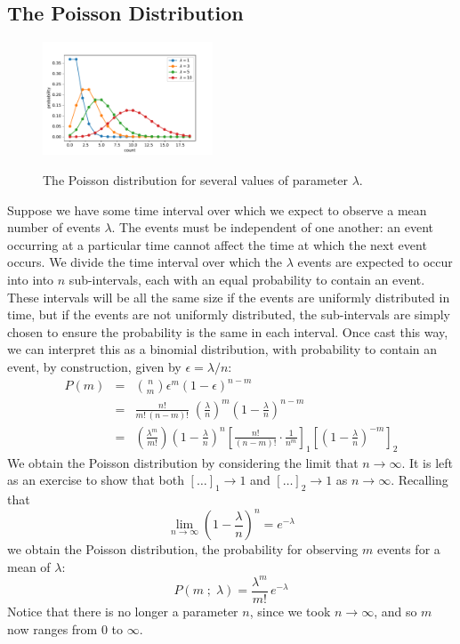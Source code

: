 \documentclass[12pt]{article}
\begin{document}
\subsection{The Poisson Distribution}

\begin{figure}[htbp]
\begin{center}
{\includegraphics[width=0.45\textwidth]{figs/chap_dist_poisson.pdf}}
\end{center}
\caption{\label{fig:poisson}  The Poisson distribution for several values of parameter $\lambda$.}
\end{figure}


Suppose we have some time interval over which we expect to observe a mean number of events $\lambda$.  The events must be independent of one another:  an event occurring at a particular time cannot affect the time at which the next event occurs.  We divide the time interval over which the $\lambda$ events are expected to occur into into $n$ sub-intervals, each with an equal probability to contain an event.  These intervals will be all the same size if the events are uniformly distributed in time, but if the events are not uniformly distributed, the sub-intervals are simply chosen to ensure the probability is the same in each interval.  Once cast this way, we can interpret this as a binomial distribution, with probability to contain an event, by construction, given by $\epsilon = \lambda / n$:
\begin{eqnarray*}
P(m) &=& \binom{n}{m} \epsilon^m (1-\epsilon)^{n-m} \\[5pt]
  &=& \frac{n!}{m! \, (n-m)!} \; \left( \frac{\lambda}{n} \right)^m \left( 1 - \frac{\lambda}{n}\right)^{n-m} \\[5pt]
  &=& \left( \frac{\lambda^m}{m!} \right) \left(1-\frac{\lambda}{n} \right)^n \left[ \frac{n!}{(n-m)!} \cdot \frac{1}{n^m}\right]_1 \left[ \left( 1 - \frac{\lambda}{n}\right)^{-m}\right]_2
\end{eqnarray*}
We obtain the Poisson distribution by considering the limit that  $n \to \infty$.   It is left as an exercise to show that both $[\dots]_1 \to 1$ and $[\dots]_2 \to 1$ as $n \to \infty$.  Recalling that
\begin{displaymath}
\lim_{n \to \infty} \left(1 - \frac{\lambda}{n} \right)^n = e^{-\lambda}
\end{displaymath}
we obtain the Poisson distribution, the probability for observing $m$ events for a mean of $\lambda$:
\begin{equation}
\label{eqn:poisson}
P(m\; ; \; \lambda) = \frac{\lambda^m}{m!} \, e^{-\lambda}
\end{equation}
Notice that there is no longer a parameter $n$, since we took $n \to \infty$, and so $m$ now ranges from 0 to $\infty$.
\end{document}
